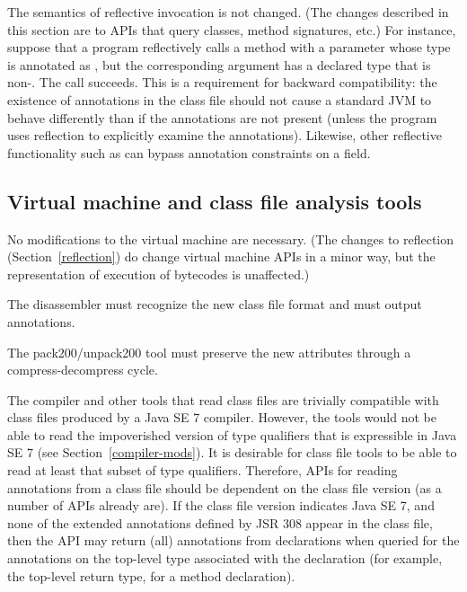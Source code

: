 \documentclass[10pt]{article}
\begin{document}
The semantics of reflective invocation is not changed.
(The changes described in this section are to APIs that query classes,
method signatures, etc.)
For instance, suppose that a program reflectively calls a method
with a parameter whose type is annotated as , but the
corresponding argument has a declared type that is non-.
The call succeeds.  This is a requirement for backward compatibility:  the
existence of annotations in the class file should not cause a standard JVM
to behave differently than if the annotations are not present (unless the
program uses reflection to explicitly examine the annotations).  Likewise,
other reflective functionality such as 
can bypass annotation constraints on a field.



\subsection{Virtual machine and class file analysis tools\label{class-file-tools}}

No modifications to the virtual machine are necessary.
(The changes to reflection (Section~\ref{reflection}) do change virtual
machine APIs in a minor way, but the representation of execution of
bytecodes is unaffected.)

The  disassembler must recognize the new class
file format and must output annotations.

The pack200/unpack200 tool must preserve the new attributes through a
compress-decompress cycle.


The compiler and other tools that read class files are trivially compatible
with class files produced by a Java SE 7 compiler.  However, the tools
would not be able to read the impoverished version of type qualifiers that
is expressible in Java SE 7 (see Section~\ref{compiler-mods}).  It is
desirable for class file tools to be able to read at least that subset of
type qualifiers.  Therefore, APIs for reading annotations from a class file
should be dependent on the class file version (as a number of APIs already
are).  If the class file version indicates Java SE 7, and none of the
extended annotations defined by JSR 308 appear in the class file, then the
API may return (all) annotations from declarations when queried for the
annotations on the top-level type associated with the declaration (for
example, the top-level return type, for a method declaration).
\end{document}
